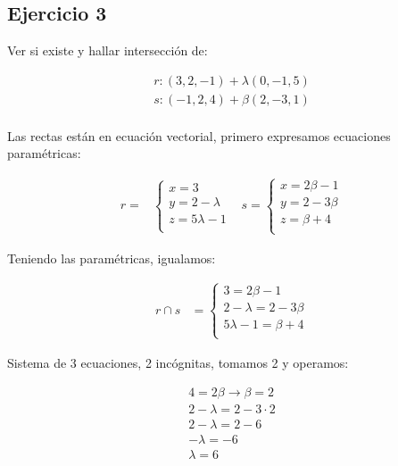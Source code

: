 \documentclass{article}
\begin{document}
\subsection*{Ejercicio 3}

Ver si existe y hallar intersección de:

\begin{align*}
    r: (3, 2, -1) + \lambda (0,-1,5) \\
    s: (-1, 2, 4) + \beta (2,-3,1)   \\
\end{align*}

Las rectas están en ecuación vectorial,
primero expresamos ecuaciones paramétricas:

\begin{align*}
    r =                  &
    \begin{cases}
        x = 3             \\
        y = 2 - \lambda   \\
        z = 5 \lambda - 1 \\
    \end{cases} &
    s =
    \begin{cases}
        x = 2 \beta - 1 \\
        y = 2 - 3 \beta \\
        z = \beta + 4   \\
    \end{cases}
\end{align*}

Teniendo las paramétricas, igualamos:

\begin{align*}
    r \cap s & =
    \begin{cases}
        3 = 2 \beta - 1           \\
        2 - \lambda = 2 - 3 \beta \\
        5 \lambda - 1 = \beta + 4 \\
    \end{cases}
\end{align*}

Sistema de 3 ecuaciones, 2 incógnitas, tomamos 2 y operamos:

\begin{align*}
    4 = 2 \beta \rightarrow \beta = 2 \\
    2 - \lambda = 2 - 3 \cdot 2       \\
    2 - \lambda = 2 - 6               \\
    -\lambda = -6                     \\
    \boxed{\lambda = 6}               \\
\end{align*}
\end{document}
